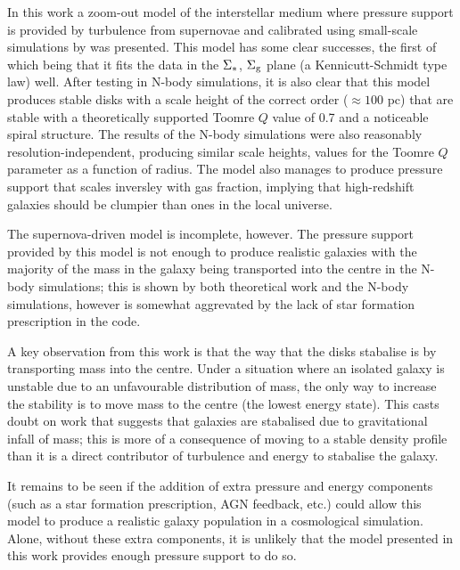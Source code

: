 In this work a zoom-out model of the interstellar medium where pressure support is provided by turbulence from supernovae and calibrated using small-scale simulations by \citet{martizzi_supernova_2015} was presented.
This model has some clear successes, the first of which being that it fits the data in the $\Sigma_*$, $\Sigma_\mathrm{g}$ plane (a Kennicutt-Schmidt type law) well.
After testing in N-body simulations, it is also clear that this model produces stable disks with a scale height of the correct order ($\approx 100$ pc) that are stable with a theoretically supported Toomre $Q$ value of 0.7 and a noticeable spiral structure.
The results of the N-body simulations were also reasonably resolution-independent, producing similar scale heights, values for the Toomre $Q$ parameter as a function of radius.
The model also manages to produce pressure support that scales inversley with gas fraction, implying that high-redshift galaxies should be clumpier than ones in the local universe.

The supernova-driven model is incomplete, however.
The pressure support provided by this model is not enough to produce realistic galaxies with the majority of the mass in the galaxy being transported into the centre in the N-body simulations; this is shown by both theoretical work and the N-body simulations, however is somewhat aggrevated by the lack of star formation prescription in the code.

A key observation from this work is that the way that the disks stabalise is by transporting mass into the centre.
Under a situation where an isolated galaxy is unstable due to an unfavourable distribution of mass, the only way to increase the stability is to move mass to the centre (the lowest energy state).
This casts doubt on work that suggests that galaxies are stabalised due to gravitational infall of mass; this is more of a consequence of moving to a stable density profile than it is a direct contributor of turbulence and energy to stabalise the galaxy.

It remains to be seen if the addition of extra pressure and energy components (such as a star formation prescription, AGN feedback, etc.) could allow this model to produce a realistic galaxy population in a cosmological simulation.
Alone, without these extra components, it is unlikely that the model presented in this work provides enough pressure support to do so.

